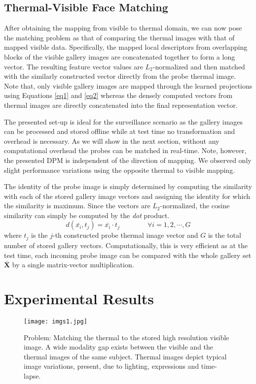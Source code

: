 \documentclass[smallextended,natbib]{svjour3}       \usepackage{graphicx}
\begin{document}
\subsection{Thermal-Visible Face Matching}
After obtaining the mapping from visible to thermal domain, we can now pose the matching problem as that of comparing the thermal images with that of mapped visible data. Specifically, the mapped local descriptors from overlapping blocks of the visible gallery images are concatenated together to form a long vector. The resulting feature vector values are $L_2$-normalized and then matched with the similarly constructed vector directly from the probe thermal image. Note that, only visible gallery images are mapped through the learned projections using Equations \ref{eq1} and \ref{eq2} whereas the densely computed vectors from thermal images are directly concatenated into the final representation vector.
 
The presented set-up is ideal for the surveillance scenario as the gallery images can be processed and stored offline while at test time no transformation and overhead is necessary. As we will show in the next section, without any computational overhead the probes can be matched in real-time. Note, however, the  presented DPM is independent of the direction of mapping. We observed only slight performance variations using the opposite thermal to visible mapping.

The identity of the probe image is simply determined by computing the similarity with each of the stored gallery image vectors and assigning the identity for which the similarity is maximum. Since the vectors are $L_2$-normalized, the cosine similarity can simply be computed by the \textit{dot} product.   
\begin{equation}
d(\bar{x_i},t_j)=\bar{x_i}\cdot t_j \qquad\qquad \forall i=1,2,\cdots ,G
\end{equation}
where $t_j$ is the $j$-th constructed probe thermal image vector and $G$ is the total number of stored gallery vectors. Computationally, this is very efficient as at the test time, each incoming probe image can be compared with the whole gallery set $\mathbf{\bar{X}}$ by a single matrix-vector multiplication.

\section{Experimental Results}
\label{EXP}
\begin{figure}
    \texttt{[image: imgs1.jpg]}
    \caption{Problem: Matching the thermal to the stored high resolution visible image. A wide modality gap exists between the visible and the thermal images of the same subject. Thermal images depict typical image variations, present, due to lighting, expressions and time-lapse.}
    \label{fig:2}
\end{figure}
\end{document}
